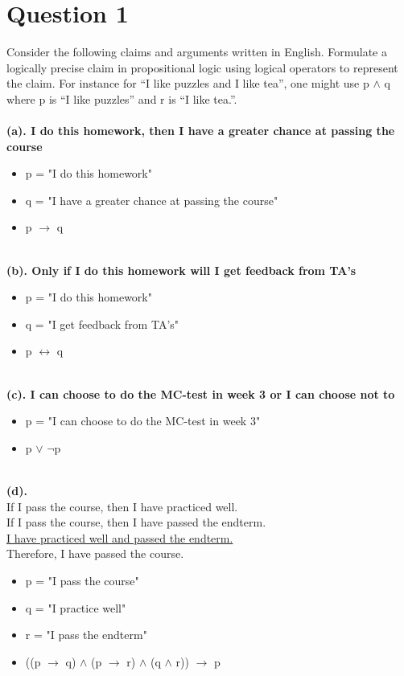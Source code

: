 \documentclass[a4paper]{article}
\begin{document}
\section{Question 1}
Consider the following claims and arguments written in English. Formulate a logically precise claim in
propositional logic using logical operators to represent the claim. For instance for “I like puzzles and I
like tea”, one might use p $\wedge $ q where p is “I like puzzles” and r is “I like tea.”.
\\\\
\textbf{(a). I do this homework, then I have a greater chance at passing the course}
\begin{itemize}
    \item p = "I do this homework"
    \item q = "I have a greater chance at passing the course"
    \item p $\rightarrow $ q
\end{itemize}
\ \\
\textbf{(b). Only if I do this homework will I get feedback from TA's}
\begin{itemize}
    \item p = "I do this homework"
    \item q = "I get feedback from TA's"
    \item p $\leftrightarrow $ q
\end{itemize}
\ \\
\textbf{(c). I can choose to do the MC-test in week 3 or I can choose not to}
\begin{itemize}
    \item p = "I can choose to do the MC-test in week 3"
    \item p $\vee $ $\neg $p
\end{itemize}
\ \\
\textbf{(d).}\\
If I pass the course, then I have practiced well.\\
If I pass the course, then I have passed the endterm.\\
\underline{I have practiced well and passed the endterm.}\\
Therefore, I have passed the course.
\begin{itemize}
    \item p = "I pass the course"
    \item q = "I practice well"
    \item r = "I pass the endterm"
    \item ((p $\rightarrow $ q) $\wedge $ (p $\rightarrow $ r) $\wedge $ (q $\wedge $ r)) $\rightarrow $ p
\end{itemize}
\end{document}
